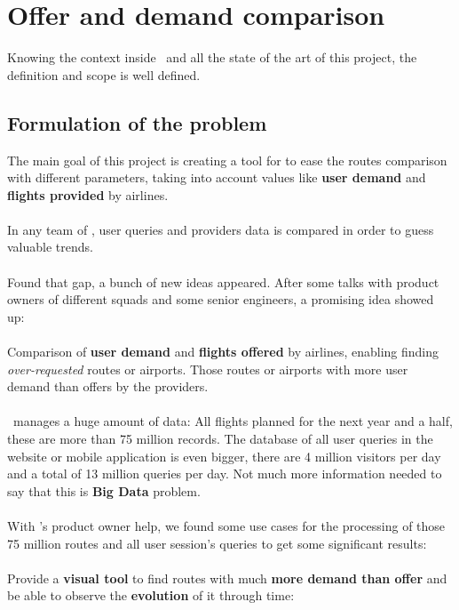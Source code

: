 
\chapter{Offer and demand comparison}

\label{chapter03}

Knowing the context inside \company\ and all the state of the art of this project, the definition and scope is well defined.


\section{Formulation of the problem} \label{problem}

The main goal of this project is creating a tool for \textit{\company} to ease the routes comparison with different parameters, taking into account values like \textbf{user demand} and \textbf{flights provided} by airlines.
\\\\
In any team of \company, user queries and providers data is compared in order to guess valuable trends.
\\\\
Found that gap, a bunch of new ideas appeared. After some talks with product owners of different squads and some senior engineers, a promising idea showed up:
\\\\
Comparison of \textbf{user demand} and \textbf{flights offered} by airlines, enabling finding \textit{over-requested} routes or airports. Those routes or airports with more user demand than offers by the providers.
\\\\
\squad\ manages a huge amount of data: All flights planned for the next year and a half, these are more than 75 million records. The database of all user queries in the website or mobile application is even bigger, there are 4 million visitors per day and a total of 13 million queries per day. Not much more information needed to say that this is \textbf{Big Data} problem.
\\\\
With \squad's product owner help, we found some use cases for the processing of those 75 million routes and all user session's queries to get some significant results:
\\\\
Provide a \textbf{visual tool} to find routes with much \textbf{more demand than offer} and be able to observe the \textbf{evolution} of it {through time}:

